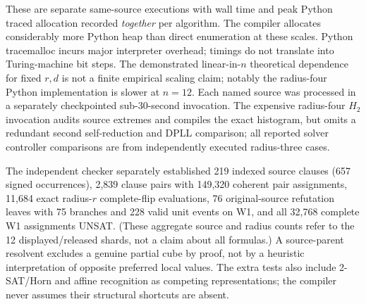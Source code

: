\documentclass[11pt]{article}
\begin{document}
\begin{center}\small
{}
\end{center}
\noindent These are separate same-source executions with wall time and peak Python traced allocation recorded \emph{together} per algorithm. The compiler allocates considerably more Python heap than direct enumeration at these scales. Python tracemalloc incurs major interpreter overhead; timings do not translate into Turing-machine bit steps. The demonstrated linear-in-$n$ theoretical dependence for fixed $r,d$ is not a finite empirical scaling claim; notably the radius-four Python implementation is slower at $n=12$. Each named source was processed in a separately checkpointed sub-30-second invocation. The expensive radius-four $H_2$ invocation audits source extremes and compiles the exact histogram, but omits a redundant second self-reduction and DPLL comparison; all reported solver controller comparisons are from independently executed radius-three cases.

\noindent The independent checker separately established 219 indexed source clauses (657 signed occurrences), 2,839 clause pairs with 149,320 coherent pair assignments, 11,684 exact radius-$r$ complete-flip evaluations, 76 original-source refutation leaves with 75 branches and 228 valid unit events on W1, and all 32,768 complete W1 assignments UNSAT. (These aggregate source and radius counts refer to the 12 displayed/released shards, not a claim about all formulas.) A source-parent resolvent excludes a genuine partial cube by proof, not by a heuristic interpretation of opposite preferred local values. The extra tests also include 2-SAT/Horn and affine recognition as competing representations; the compiler never assumes their structural shortcuts are absent.
\end{document}
